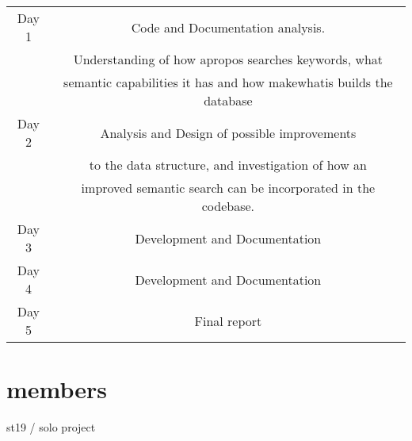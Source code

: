 \documentclass{report}
\begin{document}
\begin{center}
\begin{tabular}{| c | c |}
\hline
Day 1 & Code and Documentation analysis.\\
& Understanding of how apropos searches keywords, what\\
& semantic capabilities it has and how makewhatis builds the database \\
\hline
Day 2 & Analysis and Design of possible improvements\\
& to the data structure, and investigation of how an\\
& improved semantic search can be incorporated in the codebase. \\
\hline
Day 3 & Development and Documentation  \\
\hline
Day 4 & Development and Documentation \\
\hline
Day 5 & Final report \\
\hline
\end{tabular}
\end{center}

\section*{members}
st19 / solo project 
\end{document}
